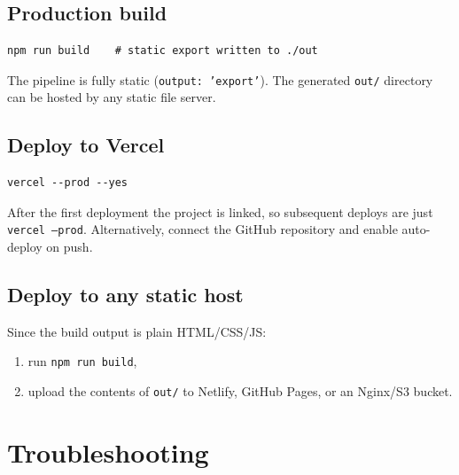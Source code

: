 \documentclass[11pt, a4paper]{article}
\begin{document}
\subsection{Production build}
\begin{lstlisting}[style=cmd]
npm run build    # static export written to ./out
\end{lstlisting}

\begin{tipbox}
The pipeline is fully static (\texttt{output: 'export'}). The generated
\texttt{out/} directory can be hosted by any static file server.
\end{tipbox}

\subsection{Deploy to Vercel}
\begin{lstlisting}[style=cmd]
vercel --prod --yes
\end{lstlisting}
After the first deployment the project is linked, so subsequent deploys are
just \texttt{vercel --prod}. Alternatively, connect the GitHub repository and
enable auto-deploy on push.

\subsection{Deploy to any static host}
Since the build output is plain HTML/CSS/JS:
\begin{enumerate}[leftmargin=1.6em, itemsep=2pt]
  \item run \texttt{npm run build},
  \item upload the contents of \texttt{out/} to Netlify, GitHub Pages,
        or an Nginx/S3 bucket.
\end{enumerate}

\section{Troubleshooting}
\end{document}
